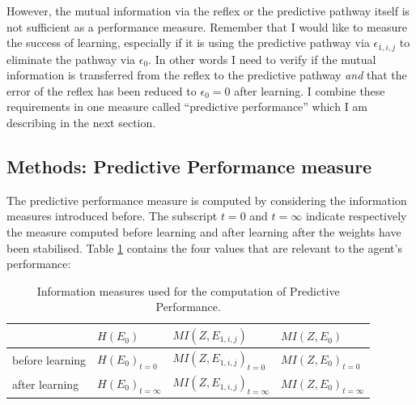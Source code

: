 However, the mutual information via the reflex or the predictive
pathway itself is not sufficient as a performance measure. Remember
that I would like to measure the success of learning, especially if it
is using the predictive
pathway via $\epsilon_{1,i,j}$ to eliminate the pathway via $\epsilon_0$.
In other words I need to verify if the mutual information is
transferred from the reflex to the predictive pathway \textsl{and}
that the error of the reflex has been reduced to $\epsilon_0=0$ after learning. 
I combine these requirements in one measure called 
``predictive performance'' which I am describing in the
next section.


\subsection{Methods: Predictive Performance measure}
The predictive performance measure is computed by considering the
information measures introduced before. The subscript $t=0$ and $t=\infty$ indicate
respectively the measure computed before learning and after learning after the weights 
have been stabilised.
Table \ref{table:PPmeausure:Values} contains the four values that are relevant
to the agent's performance:

\begin{table}[htbp]
\caption[Information values for the \textbf{PP} computation]
{Information measures used for the computation of Predictive Performance. \label{table:PPmeausure:Values}}
\begin{center}
  \begin{tabular}{| l | l | l | l |}
    \hline
		    & $H(E_0)$ & $MI(Z,E_{1,i,j})$ & $MI(Z,E_0)$\\ 
    \hline
    before learning & $H(E_0)_{t=0}$ & $MI(Z,E_{1,i,j})_{t=0}$ & $MI(Z,E_0)_{t=0}$ \\ 
    \hline
    after learning &  $H(E_0)_{t=\infty}$& $MI(Z,E_{1,i,j})_{t=\infty}$ & $MI(Z,E_0)_{t=\infty}$ \\ 
    \hline
  \end{tabular}
\end{center}
\end{table}

